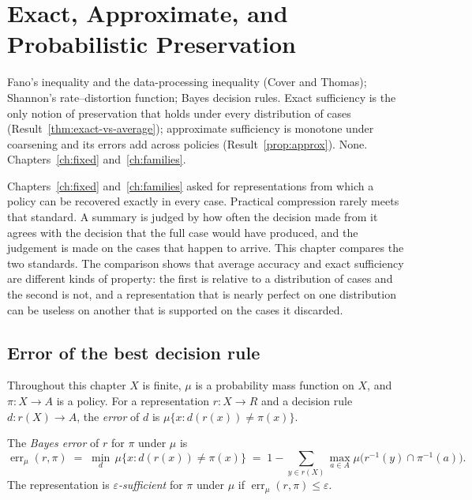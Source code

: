 \chapter{Exact, Approximate, and Probabilistic Preservation}\label{ch:approx}
{Fano's inequality and the data-processing inequality (Cover and Thomas); Shannon's rate--distortion function; Bayes decision rules.}
{Exact sufficiency is the only notion of preservation that holds under every distribution of cases (Result~\ref{thm:exact-vs-average}); approximate sufficiency is monotone under coarsening and its errors add across policies (Result~\ref{prop:approx}).}
{None.}
{Chapters~\ref{ch:fixed} and~\ref{ch:families}.}

Chapters~\ref{ch:fixed} and~\ref{ch:families} asked for representations from which a policy can be recovered exactly in every case. Practical compression rarely meets that standard. A summary is judged by how often the decision made from it agrees with the decision that the full case would have produced, and the judgement is made on the cases that happen to arrive. This chapter compares the two standards. The comparison shows that average accuracy and exact sufficiency are different kinds of property: the first is relative to a distribution of cases and the second is not, and a representation that is nearly perfect on one distribution can be useless on another that is supported on the cases it discarded.

\section{Error of the best decision rule}

Throughout this chapter $X$ is finite, $\mu$ is a probability mass function on $X$, and $\pi:X\to A$ is a policy. For a representation $r:X\to R$ and a decision rule $d:r(X)\to A$, the \emph{error} of $d$ is $\mu\{x:d(r(x))\ne\pi(x)\}$.

\begin{definition}\label{def:bayes-error}
The \emph{Bayes error} of $r$ for $\pi$ under $\mu$ is
\[
\operatorname{err}_\mu(r,\pi)\;=\;\min_{d}\,\mu\{x:d(r(x))\ne\pi(x)\}\;=\;1-\sum_{y\in r(X)}\max_{a\in A}\mu\bigl(r^{-1}(y)\cap\pi^{-1}(a)\bigr).
\]
The representation is \emph{$\varepsilon$-sufficient} for $\pi$ under $\mu$ if $\operatorname{err}_\mu(r,\pi)\le\varepsilon$.
\end{definition}

